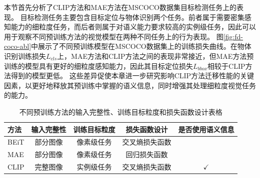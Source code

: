 
本节首先分析了CLIP方法和MAE方法在MSCOCO\cite{chen2015microsoft}数据集目标检测任务上的表现。
目标检测任务主要包含目标定位与物体识别两个任务\cite{ren2016faster}。前者属于需要密集感知能力的细粒度任务，而后者则属于对语义能力要求较高的实例级任务，因此可以用于观察不同预训练方法的视觉模型在两种不同任务上的行为表现。
图\ref{fig:fd-coco-abl}中展示了不同预训练模型在MSCOCO数据集上的训练损失曲线。在物体识别训练损失$L_{cls}$上，MAE方法和CLIP方法之间的表现非常接近，但MAE方法预训练的模型具有更好的细粒度感知能力，因此其目标定位损失$L_{bbox}$相较于CLIP方法得到的模型更低。
这些差异促使本章进一步研究影响CLIP方法迁移性能的关键因素，以更好地释放其预训练中掌握的语义信息，同时增强其处理细粒度视觉任务的能力。

\begin{table}
\caption{
不同预训练方法的输入完整性、训练目标粒度和损失函数设计表格}
\centering
  \begin{tabular}{lcccc}
    \toprule
  方法 & 输入完整性 & 训练目标粒度 & 损失函数设计 & 是否使用语义信息 \\
  \midrule
  BEiT & 部分图像 & 像素级任务 & 交叉熵损失函数 & \\ 
  MAE & 部分图像 & 像素级任务 & 回归损失函数 & \\
  \midrule
  CLIP & 完整图像 & 实例级任务 & 交叉熵损失函数 & $\checkmark$  \\
\bottomrule
  \end{tabular}
\label{tab:fd-differences}
\end{table}


